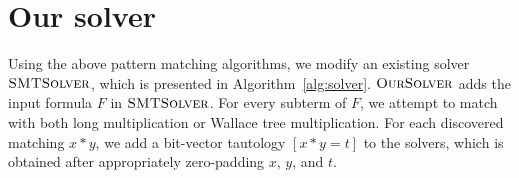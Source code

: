 \section{Our solver}


Using the above pattern matching algorithms, we modify an existing
solver $\textsc{SMTSolver}$, which
is presented in Algorithm~\ref{alg:solver}.
%
$\textsc{OurSolver}$ adds the input formula $F$ in $\textsc{SMTSolver}$.
%
For every subterm of $F$, we attempt to match with both long multiplication
or Wallace tree multiplication.
%
For each discovered matching $x*y$, we add a bit-vector tautology $[x*y = t]$ 
to the solvers, which is obtained after
appropriately zero-padding $x$, $y$, and $t$.
%



